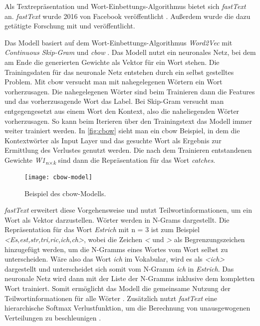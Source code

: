 Als Textrepräsentation und Wort-Einbettungs-Algorithmus bietet sich \textit{fastText} an. \textit{fastText} wurde 2016 von Facebook veröffentlicht \citep[vgl.][]{fastText_release2016}. Außerdem wurde die dazu getätigte Forschung mit \cite{bojanowski2017enriching} und \cite{joulin2016bag} veröffentlicht.

Das Modell basiert auf dem Wort-Einbettungs-Algorithmus \textit{Word2Vec} mit \textit{Continuous Skip-Gram} und \textit{\ac{cbow}} \citep[vgl.][]{bojanowski2017enriching}. Das Modell nutzt ein neuronales Netz, bei dem am Ende die generierten Gewichte als Vektor für ein Wort stehen. Die Trainingsdaten für das neuronale Netz entstehen durch ein selbst gestelltes Problem. Mit \ac{cbow} versucht man mit nahegelegenen Wörtern ein Wort vorherzusagen. Die nahegelegenen Wörter sind beim Trainieren dann die Features und das vorherzusagende Wort das Label. Bei Skip-Gram versucht man entgegengesetzt aus einem Wort den Kontext, also die naheliegenden Wörter vorherzusagen. So kann beim Iterieren über den Trainingstext das Modell immer weiter trainiert werden. In \autoref{fig:cbow} sieht man ein \ac{cbow} Beispiel, in dem die Kontextwörter als Input Layer und das gesuchte Wort als Ergebnis zur Ermittlung des Verlustes genutzt werden. Die nach dem Trainieren entstandenen Gewichte \textit{W1\textsubscript{n$\times $k}}\: sind dann die Repräsentation für das Wort \textit{\glqq catches\grqq{}}.

\begin{figure}[h]
	\centering
	\texttt{[image: cbow-model]}
	\caption{Beispiel des \ac{cbow}-Modells.}
	\label{fig:cbow}
\end{figure}

\textit{fastText} erweitert diese Vorgehensweise und nutzt Teilwortinformationen, um ein Wort als Vektor darzustellen. Wörter werden in N-Grams dargestellt. \citep[vgl.][]{bojanowski2017enriching} Die Repräsentation für das Wort \textit{Estrich} mit n = 3 ist zum Beispiel \textit{<Es,est,str,tri,ric,ich,ch>}, wobei die Zeichen \textit{<} und \textit{>} als Begrenzungszeichen hinzugefügt werden, um die N-Gramms eines Wortes vom Wort selbst zu unterscheiden. Wäre also das Wort \textit{ich} im Vokabular, wird es als \textit{<ich>} dargestellt und unterscheidet sich somit vom N-Gramm \textit{ich} in \textit{Estrich}. Das neuronale Netz wird dann mit der Liste der N-Gramms inklusive dem kompletten Wort trainiert. Somit ermöglicht das Modell die gemeinsame Nutzung der Teilwortinformationen für alle Wörter \citep[vgl.][]{bojanowski2017enriching}. Zusätzlich nutzt \textit{fastText} eine hierarchische Softmax Verlustfunktion, um die Berechnung von unausgewogenen Verteilungen zu beschleunigen \citep[vgl.][]{fastText_release2016}.

